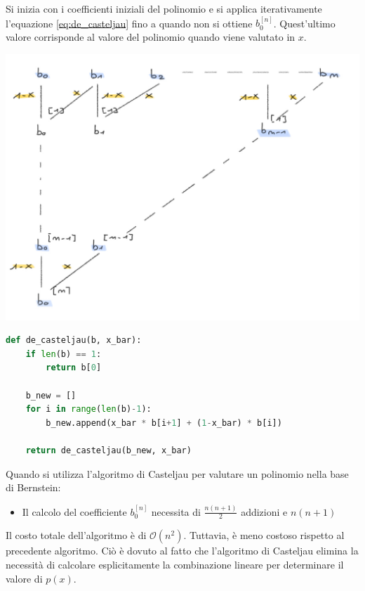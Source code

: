 \documentclass{article}
\numberwithin{equation}{section}
\begin{document}
Si inizia con i coefficienti iniziali del polinomio e si applica
iterativamente l'equazione \ref{eq:de_casteljau} fino a quando non si ottiene
$b_{0}^{[n]}$. Quest'ultimo valore corrisponde al valore del polinomio quando
viene valutato in $x$.
\begin{center}
    \includegraphics[width=0.58\linewidth]{bernstein_decasteljau}
\end{center}
\begin{lstlisting}[language=Python]
def de_casteljau(b, x_bar):
    if len(b) == 1:
        return b[0]
    
    b_new = []
    for i in range(len(b)-1):
        b_new.append(x_bar * b[i+1] + (1-x_bar) * b[i])
    
    return de_casteljau(b_new, x_bar)
\end{lstlisting}
Quando si utilizza l'algoritmo di Casteljau per valutare un polinomio nella
base di Bernstein:
\begin{itemize}
    \item Il calcolo del coefficiente $b_{0}^{[n]}$ necessita di $\frac{n(n+1)}{2}$
    addizioni e $n(n+1)$
\end{itemize}
Il costo totale dell'algoritmo è di $\mathcal{O}(n^2)$. Tuttavia, è meno
costoso rispetto al precedente algoritmo. Ciò è dovuto al fatto che
l'algoritmo di Casteljau elimina la necessità di calcolare esplicitamente la
combinazione lineare per determinare il valore di $p(x)$.
\end{document}
